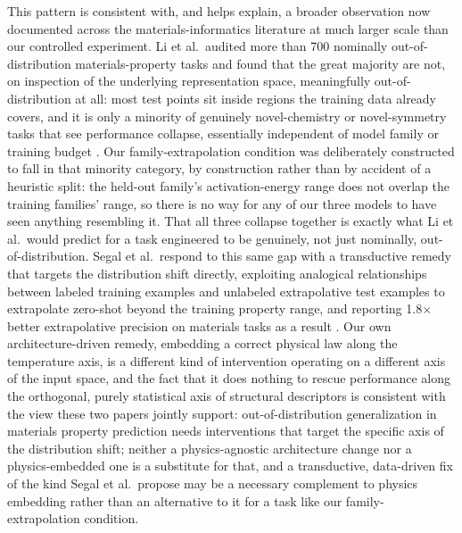 \documentclass[11pt]{article}
\begin{document}
This pattern is consistent with, and helps explain, a broader observation now documented across the materials-informatics literature at much larger scale than our controlled experiment. Li et al.\ audited more than 700 nominally out-of-distribution materials-property tasks and found that the great majority are not, on inspection of the underlying representation space, meaningfully out-of-distribution at all: most test points sit inside regions the training data already covers, and it is only a minority of genuinely novel-chemistry or novel-symmetry tasks that see performance collapse, essentially independent of model family or training budget \citep{li2025probingood}. Our family-extrapolation condition was deliberately constructed to fall in that minority category, by construction rather than by accident of a heuristic split: the held-out family's activation-energy range does not overlap the training families' range, so there is no way for any of our three models to have seen anything resembling it. That all three collapse together is exactly what Li et al.\ would predict for a task engineered to be genuinely, not just nominally, out-of-distribution. Segal et al.\ respond to this same gap with a transductive remedy that targets the distribution shift directly, exploiting analogical relationships between labeled training examples and unlabeled extrapolative test examples to extrapolate zero-shot beyond the training property range, and reporting 1.8$\times$ better extrapolative precision on materials tasks as a result \citep{segal2025knownunknowns}. Our own architecture-driven remedy, embedding a correct physical law along the temperature axis, is a different kind of intervention operating on a different axis of the input space, and the fact that it does nothing to rescue performance along the orthogonal, purely statistical axis of structural descriptors is consistent with the view these two papers jointly support: out-of-distribution generalization in materials property prediction needs interventions that target the specific axis of the distribution shift; neither a physics-agnostic architecture change nor a physics-embedded one is a substitute for that, and a transductive, data-driven fix of the kind Segal et al.\ propose may be a necessary complement to physics embedding rather than an alternative to it for a task like our family-extrapolation condition.
\end{document}
